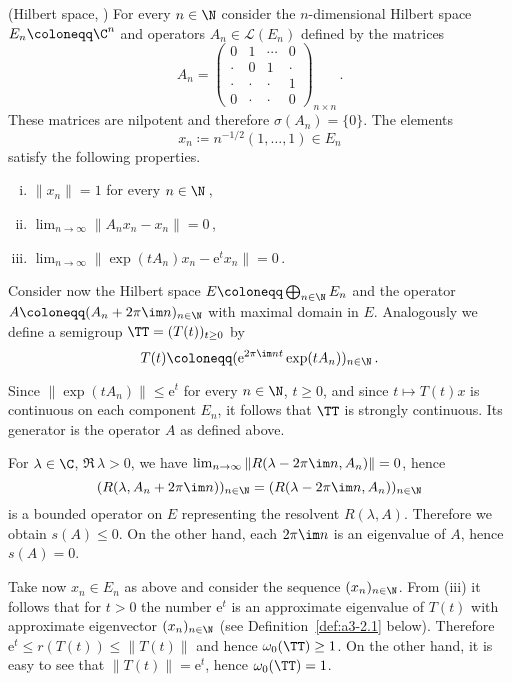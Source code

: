 \begin{example}\label{ex:a3-1.4}
(Hilbert space, \citet{zabczyk:1975})
For every $n \in \N$ consider the $n$-dimensional Hilbert space $E_{n} \coloneqq \C^{n}$ and operators $A_{n} \in \mathcal{L}(E_{n})$ defined by the matrices
\[
    A_{n} =
    \begin{pmatrix}
    0 & 1 & \cdots & 0 \\
    \cdot & 0 & 1 & \cdot \\
    \cdot & \cdot & \cdot & 1 \\
    0 & \cdot & \cdot & 0
    \end{pmatrix}_{n \times n}\,.
\]
These matrices are nilpotent and therefore $\sigma(A_{n}) = \{0\}$.
The elements 
\[
	x_{n} \coloneqq n^{-1/2}(1, \ldots, 1) \in E_{n}
\]
 satisfy the following properties.
\begin{enumerate}[(i)]
\item
	$\|x_{n}\| = 1$ for every $n \in \N$\,,

\item
	$\lim_{n \to \infty} \|A_{n}x_{n} - x_{n}\| = 0$\,,

\item
	$\lim_{n \to \infty} \|\exp(tA_{n})x_{n} - \mathrm{e}^{t}x_{n}\| = 0$\,.

\end{enumerate}
Consider now the Hilbert space $E \coloneqq \bigoplus_{n \in \N} E_{n}$ and the operator\\ $A \coloneqq (A_{n} + 2\pi\im n)_{n \in \N}$ with maximal domain in $E$.
Analogously we define a semigroup $\TT = (T(t))_{t \geq 0}$ by
\[
    T(t) \coloneqq (\mathrm{e}^{2\pi\im nt}\exp(tA_{n}))_{n \in \N}\,.
\]
\end{example}
Since $\|\exp(tA_{n})\| \leq \mathrm{e}^{t}$ for every $n \in \N$, $t \geq 0$, and since $t \mapsto T(t)x$ is continuous on each component $E_{n}$, it follows that $\TT$ is strongly continuous.
Its generator is the operator $A$ as defined above.

For $\lambda \in \C$, $\Re\,\lambda > 0$, we have 
$\lim_{n \to \infty} \|R(\lambda-2\pi\im n,A_{n})\| = 0$, hence
\[
    (R(\lambda,A_{n}+2\pi\im n))_{n \in \N} = (R(\lambda-2\pi\im n,A_{n}))_{n \in \N}
\]
is a bounded operator on $E$ representing the resolvent $R(\lambda,A)$.
Therefore we obtain $s(A) \leq 0$.
On the other hand, each $2\pi\im n$ is an eigenvalue of $A$, hence $s(A) = 0$.

Take now $x_{n} \in E_{n}$ as above and consider the sequence $(x_{n})_{n \in \N}$.
From (iii) it follows that for $t > 0$ the number $\mathrm{e}^{t}$ is an approximate eigenvalue of $T(t)$ with approximate eigenvector $(x_{n})_{n \in \N}$ (see Definition~\ref{def:a3-2.1} below).
Therefore $\mathrm{e}^{t} \leq r(T(t)) \leq \|T(t)\|$ and hence $\omega_{0}(\TT) \geq 1$.
On the other hand, it is easy to see that $\|T(t)\| = \mathrm{e}^{t}$, hence $\omega_{0}(\TT) = 1$.


